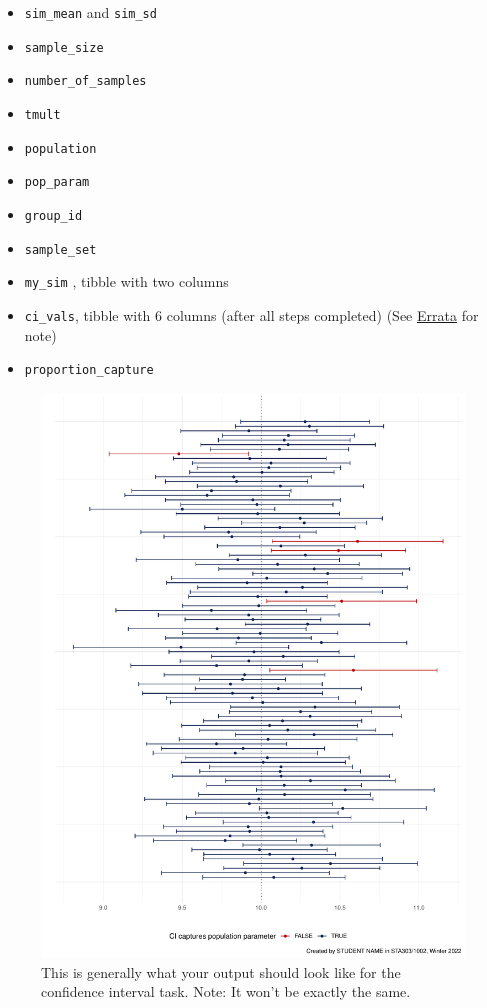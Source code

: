 \documentclass[
  openany]{book}
\begin{document}
\begin{itemize}
\item
  \texttt{sim\_mean} and \texttt{sim\_sd}
\item
  \texttt{sample\_size}
\item
  \texttt{number\_of\_samples}
\item
  \texttt{tmult}
\item
  \texttt{population}
\item
  \texttt{pop\_param}
\item
  \texttt{group\_id}
\item
  \texttt{sample\_set}
\item
  \texttt{my\_sim} , tibble with two columns
\item
  \texttt{ci\_vals}, tibble with 6 columns (after all steps completed) (See \href{https://sta303-bolton.github.io/sta303-w22-courseguide/faqs-and-errata.html\#errata}{Errata} for note)
\item
  \texttt{proportion\_capture}
\end{itemize}

\begin{figure}
\centering
\includegraphics{STA303-Course-guide_files/figure-latex/unnamed-chunk-8-1.pdf}
\caption{\label{fig:unnamed-chunk-8}This is generally what your output should look like for the confidence interval task. Note: It won't be exactly the same.}
\end{figure}
\end{document}
